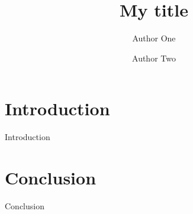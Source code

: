 \documentclass[12pt]{article}
\begin{document}
\def\spacingset#1{\renewcommand{\baselinestretch}%
{#1}\small\normalsize} \spacingset{1}

\date{}

\newcommand{\footremember}[2]{%
    \footnote{#2}
    \newcounter{#1}
    \setcounter{#1}{\value{footnote}}%
}
\newcommand{\footrecall}[1]{%
    \footnotemark[\value{#1}]%
} 
\newcommand{\mytitle}{My title}  

\title{\bf \mytitle}
\author{Author One \and Author Two }

\maketitle


\spacingset{1.9} %


\section{Introduction}
\label{sec:intro}
Introduction


\section{Conclusion}
Conclusion





\end{document}
